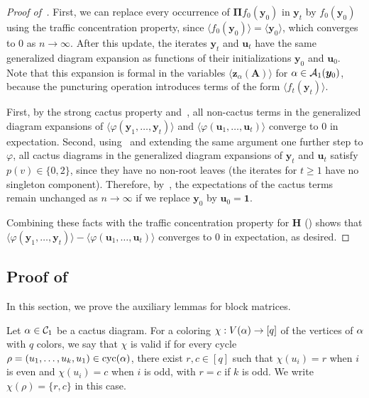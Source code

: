 \begin{proof}[Proof of~]
    First, we can replace every
    occurrence of $\bm \Pi f_0(\bm y_0)$
    in $\bm y_t$ by $f_0(\bm y_0)$ using
    the traffic concentration property,
    since $\langle f_0(\bm y_0)\rangle = \langle \bm y_0\rangle$, which converges to $0$ as $n\to\infty$.
    After this update, the iterates $\bm y_t$ and $\bm u_t$ have the same generalized diagram expansion as functions of their initializations $\bm y_0$ and $\bm u_0$. 
    Note that this expansion is formal in the variables $\langle \bm z_{\alpha}(\bm A)\rangle$ for $\alpha\in {\cal A}_1(\bm y_0)$, because the puncturing operation introduces terms of the form $\langle f_t(\bm y_t)\rangle$.
    
    First, by the strong cactus property and~, all non-cactus terms in the generalized diagram expansions of $\langle\varphi(\bm y_1,\ldots,\bm y_t)\rangle$ and $\langle\varphi(\bm u_1,\ldots,\bm u_t)\rangle$ converge to $0$ in expectation.
    Second, using~ and extending the same argument one further step to $\varphi$,
    all cactus diagrams in the generalized diagram expansions of $\bm y_t$ and $\bm u_t$ satisfy $p(v) \in \{0,2\}$, since they have no non-root leaves (the iterates for $t\ge 1$ have no singleton component).
    Therefore, by~, the expectations of the cactus terms remain unchanged as $n\to\infty$ if we replace $\bm y_0$ by $\bm u_0=\bm 1$.

    Combining these facts with the traffic concentration property for $\bm H$ () shows that $\langle \varphi(\bm y_1, \ldots, \bm y_t)\rangle - \langle \varphi(\bm u_1, \ldots, \bm u_t)\rangle$ converges to $0$ in expectation, as desired.
\end{proof}


\subsection{\texorpdfstring{Proof of~}{Proof of block matrix limits}}
\label{app:block-matrix}

In this section, we prove the auxiliary lemmas for block matrices.

\begin{definition}
    Let $\alpha \in {\cal C}_1$ be a cactus diagram.
    For a {coloring} $\chi:V(\alpha)\to [q]$
    of the vertices of $\alpha$ with $q$ colors, we say that $\chi$ is {valid} if for every cycle $\rho =(u_1, \ldots, u_k, u_1)\in \mathrm{cyc}(\alpha)$, there exist $r,c\in [q]$ such that $\chi(u_i) = r$ when $i$ is even and $\chi(u_i) = c$ when $i$ is odd, with $r=c$ if $k$ is odd. 
    We write
    $\chi(\rho)=\{r,c\}$ in this case.
\end{definition}

